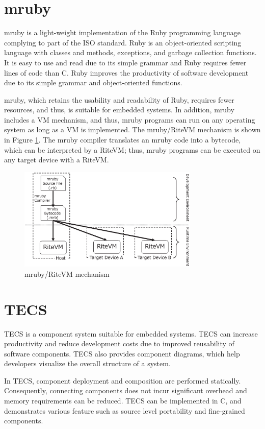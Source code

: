 \documentclass[conference]{IEEEtran/IEEEtran/IEEEtran}
\begin{document}
\newpage
\appendices
\section{mruby}
mruby is a light-weight implementation of the Ruby programming language complying to part of the ISO standard.
Ruby is an object-oriented scripting language with classes and methods, exceptions, and garbage collection functions.
It is easy to use and read due to its simple grammar and Ruby requires fewer lines of code than C.
Ruby improves the productivity of software development due to its simple grammar and object-oriented functions.

mruby, which retains the usability and readability of Ruby, requires fewer resources, and thus, is suitable for embedded systems.
In addition, mruby includes a VM mechanism, and thus, mruby programs can run on any operating system as long as a VM is implemented.
The mruby/RiteVM mechanism is shown in Figure \ref{fig:mruby}.
The mruby compiler translates an mruby code into a bytecode, which can be interpreted by a RiteVM; thus, mruby programs can be executed on any target device with a RiteVM.
\begin{figure}[h]
    \centering
    \includegraphics[width=8.6cm,clip]{figure/mruby.eps}
    \vspace{-2mm}
    \caption{mruby/RiteVM mechanism}
    \vspace{-2mm}
    \label{fig:mruby}
\end{figure}

\section{TECS}
TECS is a component system suitable for embedded systems.
TECS can increase productivity and reduce development costs due to improved reusability of software components.
TECS also provides component diagrams, which help developers visualize the overall structure of a system.

In TECS, component deployment and composition are performed statically.
Consequently, connecting components does not incur significant overhead and memory requirements can be reduced.
TECS can be implemented in C, and demonstrates various feature such as source level portability and fine-grained components.
\end{document}

